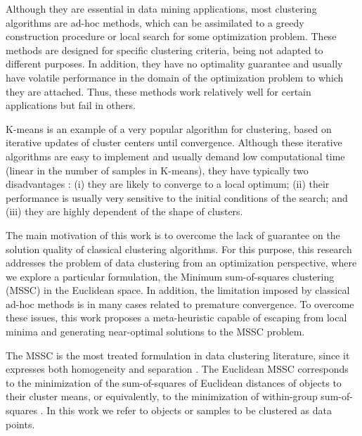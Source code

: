 Although they are essential in data mining applications, most clustering algorithms are ad-hoc methods, which can be assimilated to a greedy construction procedure or local search for some optimization problem. These methods are designed for specific clustering criteria, being not adapted to different purposes. In addition, they have no optimality guarantee and usually have volatile performance in the domain of the optimization problem to which they are attached. Thus, these methods work relatively well for certain applications but fail in others.

K-means is an example of a very popular algorithm for clustering, based on iterative updates of cluster centers until convergence. Although these iterative algorithms are easy to implement and usually demand low computational time (linear in the number of samples in K-means), they have typically two disadvantages \cite{Das2009}: (i) they are likely to converge to a local optimum; (ii) their performance is usually very sensitive to the initial conditions of the search; and (iii) they are highly dependent of the shape of clusters.

The main motivation of this work is to overcome the lack of guarantee on the solution quality of classical clustering algorithms. For this purpose, this research addresses the problem of data clustering from an optimization perspective, where we explore a particular formulation, the Minimum sum-of-squares clustering (MSSC) in the Euclidean space. In addition, the limitation imposed by classical ad-hoc methods is in many cases related to premature convergence. To overcome these issues, this work proposes a meta-heuristic capable of escaping from local minima and generating near-optimal solutions to the MSSC problem.

The MSSC is the most treated formulation in data clustering literature, since it expresses both homogeneity and separation \cite{Hansen2009}. The Euclidean MSSC corresponds to the minimization of the sum-of-squares of Euclidean distances of objects to their cluster means, or equivalently, to the minimization of within-group sum-of-squares \cite{Xavier2011}. In this work we refer to objects or samples to be clustered as data points.


